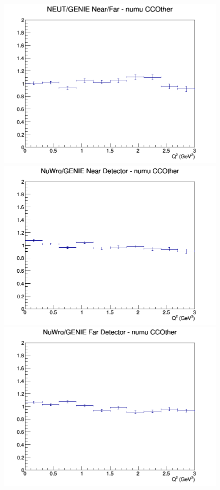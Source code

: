 \documentclass[12pt]{article}
\begin{document}
\begin{figure}[h]
\endminipage
{}
\includegraphics[width=\linewidth]{eff_Q2/GAr/ratios/CCOther_NEUT_GENIE_numu_NF_Q2.png}
\endminipage
\newline
{}
\includegraphics[width=\linewidth]{eff_Q2/GAr/ratios/CCOther_NuWro_GENIE_numu_near_Q2.png}
\endminipage
{}
\includegraphics[width=\linewidth]{eff_Q2/GAr/ratios/CCOther_NuWro_GENIE_numu_far_Q2.png}

\end{figure}
\end{document}
